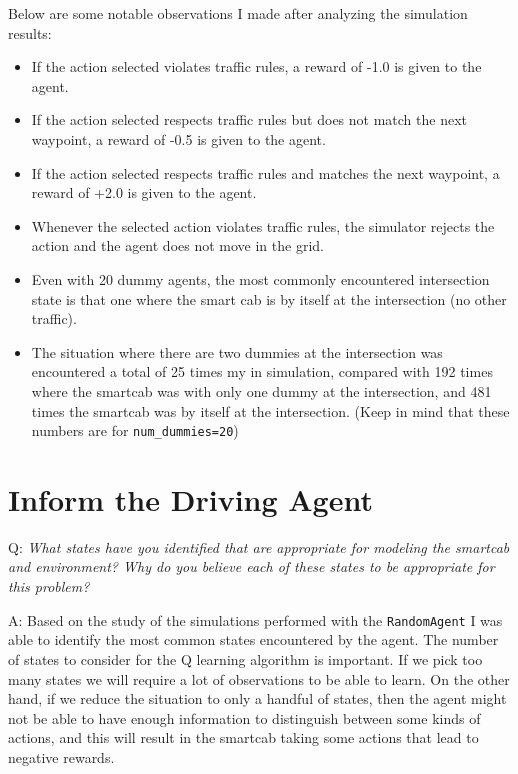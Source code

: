 \documentclass[conference]{IEEEtran}
\begin{document}
Below are some notable observations I made after analyzing the simulation
results:

\begin{itemize}
\item If the action selected violates traffic rules, a reward of -1.0 is given
    to the agent. 

\item If the action selected respects traffic rules but does not match the next
    waypoint, a reward of -0.5 is given to the agent. 

\item If the action selected respects traffic rules and matches the next
    waypoint, a reward of +2.0 is given to the agent. 
  
\item Whenever the selected action violates traffic rules, the simulator
    rejects the action and the agent does not move in the grid. 
  
\item Even with 20 dummy agents, the most commonly encountered
    intersection state is that one where the smart cab is by itself at the
        intersection (no other traffic).  
  
\item The situation where there are two dummies at the intersection was
    encountered a total of 25 times my in simulation, compared with 192 times
        where the smartcab was with only one dummy at the intersection, and 481
        times the smartcab was by itself at the intersection. (Keep in mind
        that these numbers are for \verb"num_dummies=20")

\end{itemize} 


\section{Inform the Driving Agent}

\vspace{1em}
\noindent Q: \textit{What states have you identified that are appropriate for
modeling the smartcab and environment? Why do you believe each of these states
to be appropriate for this problem?}


\vspace{2em} \noindent A: Based on the study of the simulations performed with
the \verb"RandomAgent" I was able to identify the most common states
encountered by the agent.  The number of states to consider for the Q learning
algorithm is important.  If we pick too many states we will require a lot of
observations to be able to learn.  On the other hand, if we reduce the
situation to only a handful of states, then the agent might not be able to have
enough information to distinguish between some kinds of actions, and this will
result in the smartcab taking some actions that lead to negative rewards.
\end{document}
